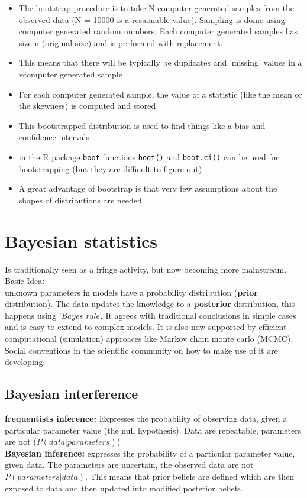 \documentclass{article}
\begin{document}
\begin{itemize}
    \item The bootstrap procedure is to take N computer generated samples from the observed data (N = 10000 is a resaonable value). Sampling is dome using computer generated random numbers. Each computer generated samples has size n (original size) and is performed with replacement.
    \item This means that there will be typically be duplicates and 'missing' values in a vćomputer generated sample
    \item For each computer generated sample, the value of a statistic (like the mean or the skewness) is computed and stored
    \item This bootstrapped distribution is used to find things like a bias and confidence intervals
    \item in the R package \texttt{boot} functions \texttt{boot()} and \texttt{boot.ci()} can be used for bootstrapping (but they are difficult to figure out)
    \item A great advantage of bootstrap is that very few assumptions about the shapes of distributions are needed
\end{itemize}

\section{Bayesian statistics}
Is traditionally seen as a fringe activity, but now becoming more mainstream. Basic Idea: \\
unknown parameters in models have a probability distribution (\textbf{prior} distribution). The data updates the knowledge to a \textbf{posterior} distribution, this happens using '\textit{Bayes rule}'. It agrees with traditional conclusions in simple cases and is easy to extend to complex models. It is also now supported by efficient computational (simulation) approaces like Markov chain monte carlo (MCMC). Social conventions  in the scientific community on how to make use of it are developing. 

\subsection{Bayesian interference}
\textbf{frequentists inference:} Expresses the probability of observing data, given a particular parameter value (the null hypothesis). Data are repeatable, parameters are not ($P(data|parameters)$)\\
\textbf{Bayesian inference:} expresses the probability of a particular parameter value, given data. The parameters are uncertain, the observed data are not $P(parameters|data)$. This means that prior beliefs are defined which are then exposed to data and then updated into modified posterior beliefs.\\
\end{document}
